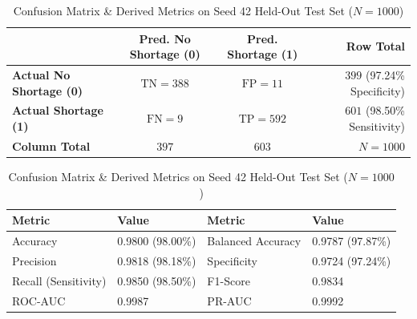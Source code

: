 \begin{table}[htbp]
\centering
\caption{Confusion Matrix & Derived Metrics on Seed 42 Held-Out Test Set ($N = 1000$)}
\label{tab:confusion_matrix}
\begin{tabular}{lccr}
\toprule
& \textbf{Pred. No Shortage (0)} & \textbf{Pred. Shortage (1)} & \textbf{Row Total} \\
\midrule
\textbf{Actual No Shortage (0)} & $\text{TN} = 388$ & $\text{FP} = 11$ & $399$ (97.24\% Specificity) \\
\textbf{Actual Shortage (1)}    & $\text{FN} = 9$ & $\text{TP} = 592$ & $601$ (98.50\% Sensitivity) \\
\midrule
\textbf{Column Total}           & $397$            & $603$            & $N = 1000$ \\
\bottomrule
\end{tabular}
\vspace{2mm}
\begin{tabular}{ll|ll}
\toprule
\textbf{Metric} & \textbf{Value} & \textbf{Metric} & \textbf{Value} \\
\midrule
Accuracy & 0.9800 (98.00\%) & Balanced Accuracy & 0.9787 (97.87\%) \\
Precision & 0.9818 (98.18\%) & Specificity & 0.9724 (97.24\%) \\
Recall (Sensitivity) & 0.9850 (98.50\%) & F1-Score & 0.9834 \\
ROC-AUC & 0.9987 & PR-AUC & 0.9992 \\
\bottomrule
\end{tabular}
\end{table}
